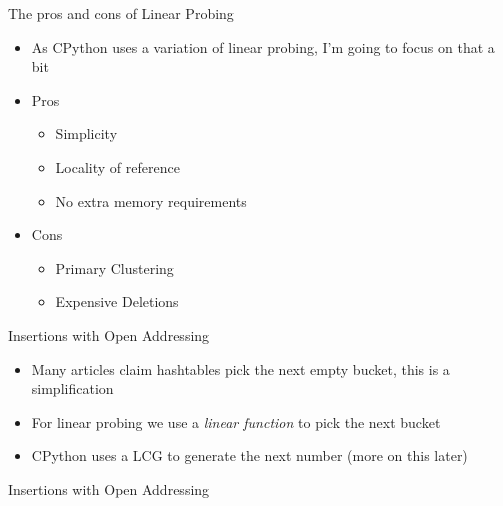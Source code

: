 \documentclass[12pt, aspectration=1610]{beamer}
\begin{document}
    \begin{frame}{The pros and cons of Linear Probing}
        \begin{itemize} 
            \item As CPython uses a variation of linear probing, I'm going to focus on that a bit
            \item Pros \\
            \begin{itemize}
                \item Simplicity
                \item Locality of reference 
                \item No extra memory requirements
            \end{itemize}
            \item Cons \\
            \begin{itemize}
                \item Primary Clustering
                \item Expensive Deletions
            \end{itemize}
        \end{itemize}
    \end{frame}

    \begin{frame}{Insertions with Open Addressing}
        \begin{itemize}
            \item Many articles claim hashtables pick the next empty bucket, this is a simplification 
            \item For linear probing we use a \textit{linear function} to pick the next bucket
            \item CPython uses a LCG to generate the next number (more on this later) 
        \end{itemize}
    \end{frame}
    
    \begin{frame}{Insertions with Open Addressing}
    \end{frame}
    
\end{document}
